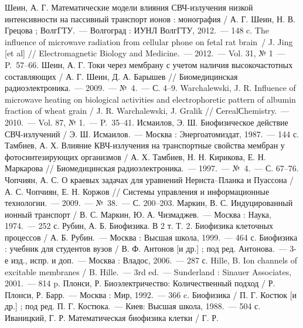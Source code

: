 \pagestyle{empty}
\def\bibname{СПИСОК ИСПОЛЬЗОВАННЫХ ИСТОЧНИКОВ}
\begin{thebibliography}{99}
 Шеин, А. Г. Математические модели влияния СВЧ-излучения низкой
    интенсивности на пассивный транспорт ионов : монография / А. Г. Шеин, Н. В.
    Грецова ; ВолгГТУ.~--- Волгоград : ИУНЛ ВолгГТУ, 2012.~--- 148 c.
 The influence of microwave radiation from cellular phone on
    fetal rat brain~/ J. Jing [et al] // Electromagnetic Biology and
    Medicine.~--- 2012.~--- Vol. 31, № 1~--- P.~57--66.
 Шеин, А. Г. Токи через мембрану с учетом наличия высокочастотных
    составляющих / А. Г. Шеин, Д. А. Барышев // Биомедицинская радиоэлектроника.~---
    2009.~--- №~4.~--- С. 4--9.
 Warchalewski, J. R. Influence of microwave
    heating on biological activities and electrophoretic pattern of
    albumin fraction of wheat grain /  J. R. Warchalewski, J. Gralik //
    СerealСhemistry.~--- 2010.~--- Vol. 87, № 1.~--- P.~35--41.
 Исмаилов, Э. Ш. Биофизическое действие СВЧ-излучений / Э. Ш.
    Исмаилов.~--- Москва : Энергоатомиздат, 1987.~--- 144 с.
 Тамбиев, А. Х. Влияние КВЧ-излучения на транспортные свойства
    мембран у фотосинтезирующих организмов / А. Х. Тамбиев, Н. Н. Кирикова,
    Е. Н. Маркарова // Биомедицинская радиоэлектроника.~--- 1997.~--- №~4.~--- С.
    67--76.
 Чопчиян, А. С. О краевых задачах для уравнений Нернста--Планка
    и Пуассона / А. С. Чопчиян, Е. Н. Коржов // Системы управления и
    информационные технологии.~--- 2009.~--- №~38.~--- С. 200--203.
 Маркин, В. С. Индуцированный ионный транспорт / В. С. Маркин,
    Ю. А. Чизмаджев.~--- Москва : Наука, 1974.~--- 252 с.
 Рубин, А. Б. Биофизика. В 2 т. Т. 2. Биофизика клеточных
    процессов / А. Б. Рубин.~--- Москва : Высшая школа, 1999.~--- 464 с.
 Биофизика : учебник для студентов вузов / В. Ф. Антонов [и др.] ;
    под ред. Антонова.~--- 3-е изд., испр. и доп.~--- Москва : Владос, 2006.~--- 287 с.
 Hille, B. Ion channels of excitable membranes / B.
    Hille.~--- 3rd ed.~--- Sunderland : Sinauer Associates, 2001.~--- 814 p.
 Плонси, Р. Биоэлектричество: Количественный подход / Р. Плонси,
    Р. Барр.~--- Москва : Мир, 1992.~--- 366 c.
 Биофизика / П. Г. Костюк [и др.] ; под ред. П. Г. Костюка.~--- Киев: Высшая
    школа, 1988.~--- 504 с.
 Иваницкий, Г. Р. Математическая биофизика клетки / Г. Р.

\end{thebibliography}
